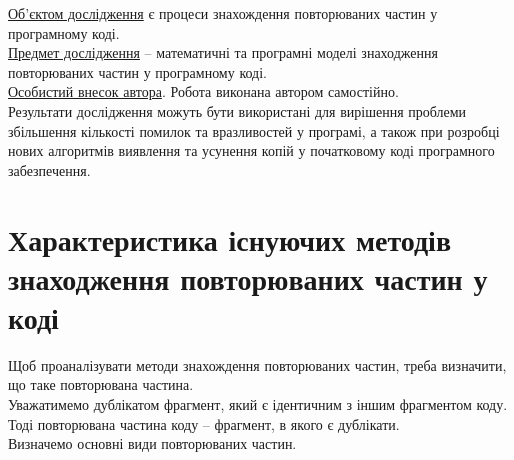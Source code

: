 \documentclass[a4paper, 14pt]{article}
\begin{document}
\uline{Об’єктом дослідження} є процеси знахождення повторюваних частин у програмному коді. \\
\uline{Предмет дослідження} – математичні та програмні моделі знаходження повторюваних частин у програмному коді. \\
\uline{Особистий внесок автора}. Робота виконана автором самостійно. \\
Результати дослідження можуть бути використані для вирішення проблеми збільшення кількості помилок та вразливостей у програмі, а також при розробці нових алгоритмів виявлення та усунення копій у початковому коді програмного забезпечення.
\newpage
\section{Характеристика існуючих методів знаходження повторюваних частин у коді}
\label{sec:characteristics}
Щоб проаналізувати методи знахождення повторюваних частин, треба визначити, що таке повторювана частина. \\
Уважатимемо дублікатом фрагмент, який є ідентичним з іншим фрагментом коду. \\
Тоді повторювана частина коду -- фрагмент, в якого є дублікати. \\
Визначемо основні види повторюваних частин.
\end{document}

